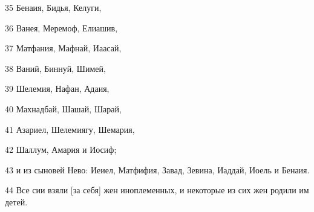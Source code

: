 \par 35 Бенаия, Бидья, Келуги,
\par 36 Ванея, Меремоф, Елиашив,
\par 37 Матфания, Мафнай, Иаасай,
\par 38 Ваний, Биннуй, Шимей,
\par 39 Шелемия, Нафан, Адаия,
\par 40 Махнадбай, Шашай, Шарай,
\par 41 Азариел, Шелемиягу, Шемария,
\par 42 Шаллум, Амария и Иосиф;
\par 43 и из сыновей Нево: Иеиел, Матфифия, Завад, Зевина, Иаддай, Иоель и Бенаия.
\par 44 Все сии взяли [за себя] жен иноплеменных, и некоторые из сих жен родили им детей.


